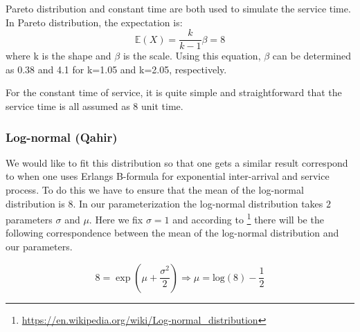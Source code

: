 Pareto distribution and constant time are both used to simulate the service time. In Pareto distribution, the expectation is:
\begin{equation}
\mathbb{E}(X)=\frac{k}{k-1} \beta = 8
\end{equation}
where k is the shape and $\beta$ is the scale. Using this equation, $\beta$ can be determined as 0.38 and 4.1 for k=1.05 and k=2.05, respectively.

For the constant time of service, it is quite simple and straightforward that the service time is all assumed as 8 unit time.

\subsubsection*{Log-normal (Qahir)}
We would like to fit this distribution so that one gets a similar result correspond to when one uses Erlangs B-formula for exponential inter-arrival and service process. To do this we have to ensure that the mean of the log-normal distribution is $8$. In our parameterization the log-normal distribution takes $2$ parameters $\sigma$ and $\mu$. Here we fix $\sigma=1$ and according to \footnote{\url{https://en.wikipedia.org/wiki/Log-normal_distribution}} there will be the following correspondence between the mean of the log-normal distribution and our parameters.

\begin{equation}
    8 = \exp(\mu + \frac{\sigma^2}{2}) \Rightarrow \mu = \text{log}(8) - \frac{1}{2}
\end{equation}